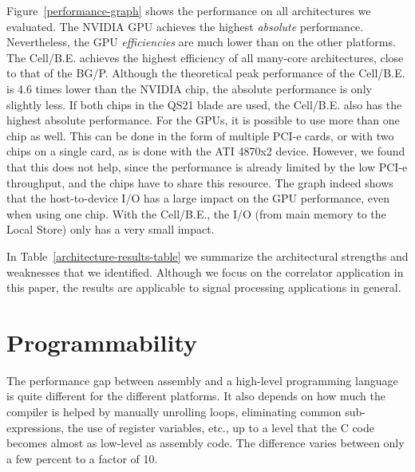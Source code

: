 \documentclass{article}
\begin{document}
Figure~\ref{performance-graph} shows the performance on all
architectures we evaluated. The NVIDIA GPU achieves the highest
\emph{absolute} performance. Nevertheless, the GPU \emph{efficiencies}
are much lower than on the other platforms.  The \mbox{Cell/B.E.}
achieves the highest efficiency of all many-core architectures, close
to that of the BG/P. Although the theoretical peak performance of the
\mbox{Cell/B.E.} is 4.6 times lower than the NVIDIA chip, the absolute
performance is only slightly less.  If both chips in the QS21 blade
are used, the \mbox{Cell/B.E.} also has the highest absolute
performance. For the GPUs, it is possible to use more than one chip as
well.  This can be done in the form of multiple PCI-e cards, or with
two chips on a single card, as is done with the ATI 4870x2
device. However, we found that this does not help, since the
performance is already limited by the low PCI-e throughput, and the
chips have to share this resource.
The graph indeed shows that the
host-to-device I/O has a large impact on the GPU performance, even when using one chip.  With
the \mbox{Cell/B.E.}, the I/O (from main memory to the Local Store) only has a very small impact.

In Table~\ref{architecture-results-table} we summarize the
architectural strengths and weaknesses that we identified.  Although
we focus on the correlator application in this paper, the
results are applicable to signal processing applications in
general.


\section{Programmability}

The performance gap between assembly and a high-level programming language 
is quite different for the different platforms. It also
depends on how much the compiler is helped by manually unrolling
loops, eliminating common sub-expressions, the use of register variables,
etc., up to a level that the C code becomes almost as low-level as assembly
code. The difference varies between only a few percent to a factor of 10. 
\end{document}
